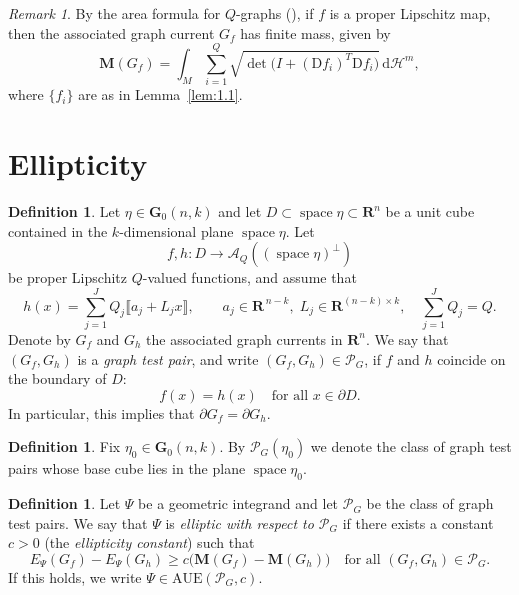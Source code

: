 \documentclass[a4paper,twoside,reqno]{article}
\theoremstyle{definition}
\theoremstyle{remark}
\theoremstyle{plain}
\theoremstyle{remark}
\newtheorem{remark}[theorem]{Remark}
\theoremstyle{definition}
\newtheorem{definition}[theorem]{Definition}
\newcommand{\ograss}[2]{\mathbf{G}_0(#1,#2)}
\newcommand{\Mass}{\mathbf{M}}
\newcommand{\AUE}{\mathrm{AUE}}
\newcommand{\R}{\mathbf{R}}
\newcommand{\HM}{\mathscr{H}}
\newcommand{\ud}{\ensuremath{\,\mathrm{d}}}
\newcommand{\uD}{\ensuremath{\mathrm{D}}}
\DeclareMathOperator{\asssp}{space}
\newcommand{\qspace}[1]{\mathcal{A}_{{#1}}}
\begin{document}
\begin{remark}
    By the area formula for $Q$-graphs (\cite[1.11]{delellis2013multiplevaluedfunctionsintegral}), 
    if $f$ is a proper Lipschitz map, then the associated graph current $G_f$ has 
    finite mass, given by
    \[
        \Mass(G_f)
        =
        \int_M \sum_{i=1}^Q
        \sqrt{\det\bigl(I + (\uD f_i)^T \uD f_i\bigr)} \ud \HM^m,
    \]
    where $\{f_i\}$ are as in Lemma~\ref{lem:1.1}.
\end{remark}

\section{Ellipticity}\label{section:ellipticity}

\begin{definition}
    \label{def:graph_test_pair}
    Let $\eta \in \ograss nk$ and let $D \subset \asssp \eta \subset \R^n$ 
    be a unit cube contained in the $k$-dimensional plane $\asssp \eta$. Let
    \[
        f, h \colon D \to \qspace{Q}((\asssp \eta)^{\perp})
    \] 
    be proper Lipschitz $Q$-valued functions, and assume that
    \[
        h(x) = \sum_{j=1}^{J} Q_j \llbracket a_j + L_j x \rrbracket,
        \qquad a_j \in \R^{\,n-k},\;
        L_j \in \R^{(n-k) \times k},\quad
        \sum_{j=1}^J Q_j = Q.
    \]
    Denote by $G_f$ and $G_h$ the associated graph currents in $\R^n$. 
    We say that $(G_f, G_h)$ is a \emph{graph test pair}, and write
    $(G_f, G_h) \in \mathcal{P}_G$, if $f$ and $h$ coincide on the boundary of $D$:
    \[
        f(x) = h(x) \quad \text{for all } x \in \partial D.
    \]
    In particular, this implies that $\partial G_f = \partial G_h$.
\end{definition}

\begin{definition}
    Fix $\eta_0 \in \ograss{n}{k}$. By $\mathcal{P}_G(\eta_0)$ we denote the
    class of graph test pairs whose base cube lies in the plane $\asssp\eta_0$.
\end{definition}

\begin{definition}
    \label{def:ellipticity}
    Let $\Psi$ be a geometric integrand and let $\mathcal{P}_G$ be the class of
    graph test pairs.
    We say that $\Psi$ is \emph{elliptic with respect to $\mathcal{P}_G$} if there
    exists a constant $c>0$ (the \emph{ellipticity constant}) such that
    \[
        E_{\Psi}(G_f) - E_{\Psi}(G_h)
        \geq
        c\bigl(\Mass(G_f) - \Mass(G_h)\bigr)
        \quad \text{for all } (G_f,G_h)\in\mathcal{P}_G.
    \]
    If this holds, we write $\Psi \in \AUE(\mathcal{P}_G,c)$.
\end{definition}
\end{document}
